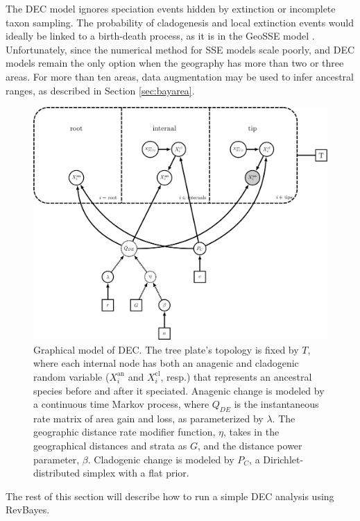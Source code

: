 The DEC model ignores speciation events hidden by extinction or incomplete taxon sampling.
The probability of cladogenesis and local extinction events would ideally be linked to a birth-death process, as it is in the GeoSSE model \citep{goldberg11}.
Unfortunately, since the numerical method for SSE models scale poorly, and DEC models remain the only option when the geography has more than two or three areas.
For more than ten areas, data augmentation may be used to infer ancestral ranges, as described in Section \ref{sec:bayarea}.

\begin{figure}[H]
\centering
\includegraphics[width=5in]{figures/bg_dec_dag}
\caption{Graphical model of DEC. The tree plate's topology is fixed by $T$, where each internal node has both an anagenic and cladogenic random variable ($X_i^{\text{an}}$ and $X_i^{\text{cl}}$, resp.) that represents an ancestral species before and after it speciated. Anagenic change is modeled by a continuous time Markov process, where $Q_{DE}$ is the instantaneous rate matrix of area gain and loss, as parameterized by $\lambda$. The geographic distance rate modifier function, $\eta$, takes in the geographical distances and strata as $G$, and the distance power parameter, $\beta$. Cladogenic change is modeled by $P_C$, a Dirichlet-distributed simplex with a flat prior.}
\end{figure}

The rest of this section will describe how to run a simple DEC analysis using RevBayes.

\newpage


